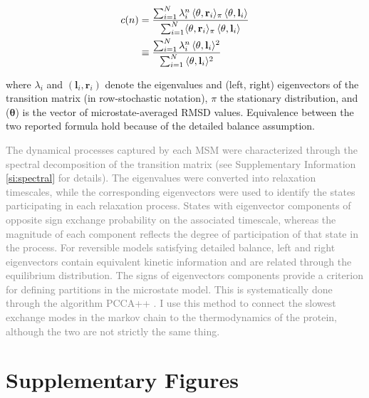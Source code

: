 \begin{align}
c(n)
&=
\frac{
\sum_{i=1}^{N}
\lambda_i^{n}\,
\langle \theta,\mathbf{r}_i\rangle_\pi\,
\langle \theta,\mathbf{l}_i\rangle
}
{
\sum_{i=1}^{N}
\langle \theta,\mathbf{r}_i\rangle_\pi\,
\langle \theta,\mathbf{l}_i\rangle
}
\notag \\
&\equiv
\frac{
\sum_{i=1}^{N}
\lambda_i^{n}\,
\langle \theta,\mathbf{l}_i\rangle^2
}
{\sum_{i=1}^{N}\, \langle \theta,\mathbf{l}_i\rangle^2} \notag
\end{align}

where $\lambda_i$ and $(\mathbf{l}_i, \mathbf{r}_i)$ denote the eigenvalues and (left, right) eigenvectors of the transition matrix (in row-stochastic notation), $\pi$ the stationary distribution,
and ($\boldsymbol{\theta}$) is the vector of microstate-averaged RMSD values. Equivalence between the two reported formula hold because of the detailed balance assumption.
%


\textcolor{gray}{
The dynamical processes captured by each MSM were characterized through the spectral decomposition of the transition matrix (see Supplementary Information \ref{si:spectral} for details). 
The eigenvalues were converted into relaxation timescales, while the corresponding eigenvectors were used to identify the states participating in each relaxation process. 
States with eigenvector components of opposite sign exchange probability on the associated timescale, whereas the magnitude of each component reflects the degree of participation
of that state in the process. For reversible models satisfying detailed balance, left and right eigenvectors contain equivalent kinetic information
and are related through the equilibrium distribution.
The signs of eigenvectors components provide a criterion for defining partitions in the microstate model. This is systematically done through the algorithm PCCA++ \cite[Ch. 2.5.1 and 2.5.2]{thebible}. I use this method to connect
the slowest exchange modes in the markov chain to the thermodynamics of the protein, although the two are not strictly the same thing. 
}

%
%
%
\clearpage
\onecolumngrid
\section{Supplementary Figures}
\setcounter{figure}{0}
\renewcommand{\thefigure}{SF\arabic{figure}}


